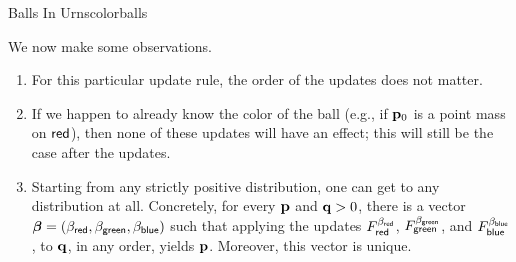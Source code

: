 \documentclass{article}
\begin{document}
\begin{examplex}{Balls In Urns}{colorballs}


    We now make some observations.
    \begin{enumerate}
        \item For this particular update rule, the order of the updates does not matter.
        \item If we happen to already know the color of the ball (e.g., if $\mathbf{p}_0$ is a point mass on ${\mathsf{red}}$), then none of these updates will have an effect; this will still be the case after the updates.
        \item Starting from any strictly positive distribution, one can get to any distribution at all.
        Concretely, for every $\mathbf{p}$ and $\mathbf{q} > 0$, there is a vector
        $\boldsymbol\beta
        = (\beta_{{\mathsf{red}}}, \beta_{{\mathsf{green}}}, \beta_{{\mathsf{blue}}})$
        such that applying the updates
        $F^{\beta_{{\mathsf{red}}}
            }_{{\mathsf{red}}}$,
        $F^{\beta_{{\mathsf{green}}}
            }_{{\mathsf{green}}}$, and
        $F^{\beta_{{\mathsf{blue}}}
            }_{{\mathsf{blue}}}$,
        to $\mathbf{q}$, in any order, yields $\mathbf{p}$. Moreover, this vector is unique.


    \end{enumerate}

\end{examplex}

\begin{example}

\end{example}
\end{document}
